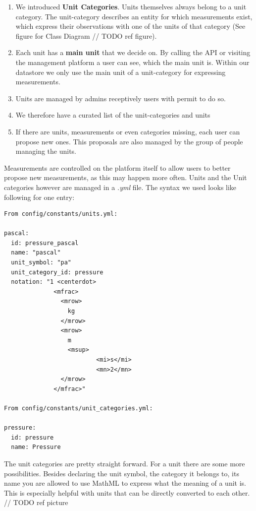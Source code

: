 \begin{enumerate}
\def\labelenumi{\arabic{enumi}.}
\tightlist
\item
  We introduced \textbf{Unit Categories}. Units themselves always belong
  to a unit category. The unit-category describes an entity for which
  measurements exist, which express their observations with one of the
  units of that category (See figure for Class Diagram // TODO ref
  figure).
\item
  Each unit has a \textbf{main unit} that we decide on. By calling the
  API or visiting the management platform a user can see, which the main
  unit is. Within our datastore we only use the main unit of a
  unit-category for expressing measurements.
\item
  Units are managed by admins receptively users with permit to do so.
\item
  We therefore have a curated list of the unit-categories and units
\item
  If there are units, measurements or even categories missing, each user
  can propose new ones. This proposals are also managed by the group of
  people managing the units.
\end{enumerate}

Measurements are controlled on the platform itself to allow users to
better propose new measurements, as this may happen more often. Units
and the Unit categories however are managed in a \emph{.yml} file. The
syntax we used looks like following for one entry:

\begin{verbatim}
From config/constants/units.yml:

pascal:
  id: pressure_pascal
  name: "pascal"
  unit_symbol: "pa"
  unit_category_id: pressure
  notation: "1 <centerdot>
              <mfrac>
                <mrow>
                  kg
                </mrow>
                <mrow>
                  m
                  <msup>
                          <mi>s</mi>
                          <mn>2</mn>
                </mrow>
              </mfrac>"

From config/constants/unit_categories.yml:

pressure:
  id: pressure
  name: Pressure
\end{verbatim}

The unit categories are pretty straight forward. For a unit there are
some more possibilities. Besides declaring the unit symbol, the category
it belongs to, its name you are allowed to use MathML to express what
the meaning of a unit is. This is especially helpful with units that can
be directly converted to each other. // TODO ref picture

